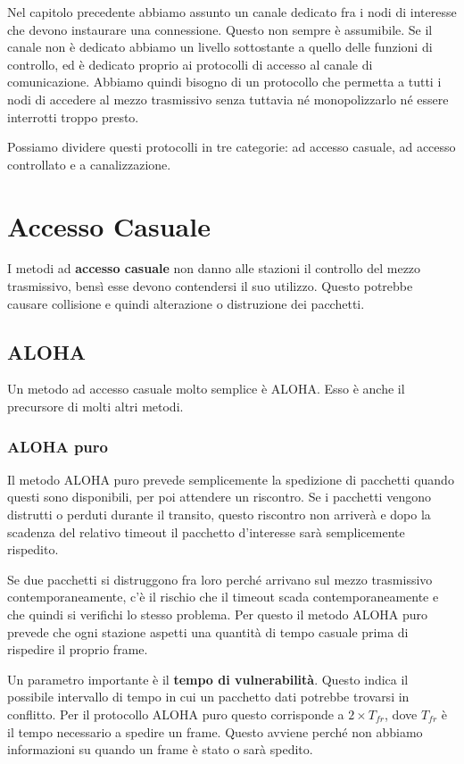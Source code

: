 Nel capitolo precedente abbiamo assunto un canale dedicato fra i nodi di interesse che devono instaurare una connessione. Questo non sempre è assumibile. Se il canale non è dedicato abbiamo un livello sottostante a quello delle funzioni di controllo, ed è dedicato proprio ai protocolli di accesso al canale di comunicazione. Abbiamo quindi bisogno di un protocollo che permetta a tutti i nodi di accedere al mezzo trasmissivo senza tuttavia né monopolizzarlo né essere interrotti troppo presto.

Possiamo dividere questi protocolli in tre categorie: ad accesso casuale, ad accesso controllato e a canalizzazione.

\section{Accesso Casuale}
    I metodi ad \textbf{accesso casuale} non danno alle stazioni il controllo del mezzo trasmissivo, bensì esse devono contendersi il suo utilizzo. Questo potrebbe causare collisione e quindi alterazione o distruzione dei pacchetti.
    
    \subsection{ALOHA}
        Un metodo ad accesso casuale molto semplice è ALOHA. Esso è anche il precursore di molti altri metodi.
        
        \subsubsection{ALOHA puro}
            Il metodo ALOHA puro prevede semplicemente la spedizione di pacchetti quando questi sono disponibili, per poi attendere un riscontro. Se i pacchetti vengono distrutti o perduti durante il transito, questo riscontro non arriverà e dopo la scadenza del relativo timeout il pacchetto d'interesse sarà semplicemente rispedito.
            
            Se due pacchetti si distruggono fra loro perché arrivano sul mezzo trasmissivo contemporaneamente, c'è il rischio che il timeout scada contemporaneamente e che quindi si verifichi lo stesso problema. Per questo il metodo ALOHA puro prevede che ogni stazione aspetti una quantità di tempo casuale prima di rispedire il proprio frame.
            
            Un parametro importante è il \textbf{tempo di vulnerabilità}. Questo indica il possibile intervallo di tempo in cui un pacchetto dati potrebbe trovarsi in conflitto. Per il protocollo ALOHA puro questo corrisponde a $2 \times T_{fr}$, dove $T_{fr}$ è il tempo necessario a spedire un frame. Questo avviene perché non abbiamo informazioni su quando un frame è stato o sarà spedito.
            

